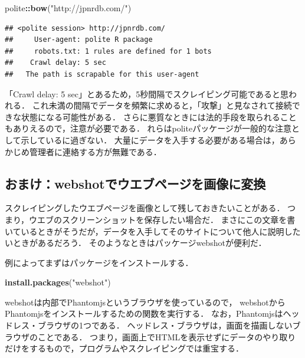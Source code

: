 \documentclass[
]{article}
\newenvironment{Shaded}{\begin{snugshade}}{\end{snugshade}}
\newcommand{\FunctionTok}[1]{\textcolor[rgb]{0.13,0.29,0.53}{\textbf{#1}}}
\newcommand{\NormalTok}[1]{#1}
\newcommand{\SpecialCharTok}[1]{\textcolor[rgb]{0.81,0.36,0.00}{\textbf{#1}}}
\newcommand{\StringTok}[1]{\textcolor[rgb]{0.31,0.60,0.02}{#1}}
\begin{document}
\begin{Shaded}
\begin{Highlighting}[]
\NormalTok{polite}\SpecialCharTok{::}\FunctionTok{bow}\NormalTok{(}\StringTok{"http://jpnrdb.com/"}\NormalTok{)}
\end{Highlighting}
\end{Shaded}

\begin{verbatim}
## <polite session> http://jpnrdb.com/
##     User-agent: polite R package
##     robots.txt: 1 rules are defined for 1 bots
##    Crawl delay: 5 sec
##   The path is scrapable for this user-agent
\end{verbatim}

「Crawl delay: 5 sec」とあるため，5秒間隔でスクレイピング可能であると思われる．
これ未満の間隔でデータを頻繁に求めると，「攻撃」と見なされて接続できな状態になる可能性がある．
さらに悪質なときには法的手段を取られることもありえるので，注意が必要である．
れらはpoliteパッケージが一般的な注意として示しているに過ぎない．
大量にデータを入手する必要がある場合は，あらかじめ管理者に連絡する方が無難である．

\hypertarget{webshot}{%
\subsection{おまけ：webshotでウエブページを画像に変換}\label{webshot}}

スクレイピングしたウエブページを画像として残しておきたいことがある．
つまり，ウエブのスクリーンショットを保存したい場合だ．
まさにこの文章を書いているときがそうだが，データを入手してそのサイトについて他人に説明したいときがあるだろう．
そのようなときはパッケージwebshotが便利だ．

例によってまずはパッケージをインストールする．

\begin{Shaded}
\begin{Highlighting}[]
\FunctionTok{install.packages}\NormalTok{(}\StringTok{"webshot"}\NormalTok{)}
\end{Highlighting}
\end{Shaded}

webshotは内部でPhantomjsというブラウザを使っているので，
webshotからPhantomjsをインストールするための関数を実行する．
なお，Phantomjsはヘッドレス・ブラウザの1つである．
ヘッドレス・ブラウザは，画面を描画しないブラウザのことである．
つまり，画面上でHTMLを表示せずにデータのやり取りだけをするもので，プログラムやスクレイピングでは重宝する．
\end{document}
